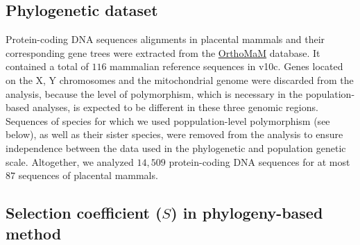 \documentclass{article}
\newcommand{\Sphy}{S}
\begin{document}
    \subsection{Phylogenetic dataset}

    Protein-coding DNA sequences alignments in placental mammals and their corresponding gene trees were extracted from the \href{https://www.orthomam.univ-montp2.fr}{OrthoMaM} database. It contained a total of $116$ mammalian reference sequences in v10c\cite{ranwez_orthomam_2007, douzery_orthomam_2014, scornavacca_orthomam_2019}.
    Genes located on the X, Y chromosomes and the mitochondrial genome were discarded from the analysis, because the level of polymorphism, which is necessary in the population-based analyses, is expected to be different in these three genomic regions.
    Sequences of species for which we used poppulation-level polymorphism (see below), as well as their sister species, were removed from the analysis to ensure independence between the data used in the phylogenetic and population genetic scale.
    Altogether, we analyzed $14,509$ protein-coding DNA sequences for at most $87$ sequences of placental mammals.

    \subsection{Selection coefficient ($\Sphy$) in phylogeny-based method}
    \label{subsec:s-phylogeny-method}
\end{document}
